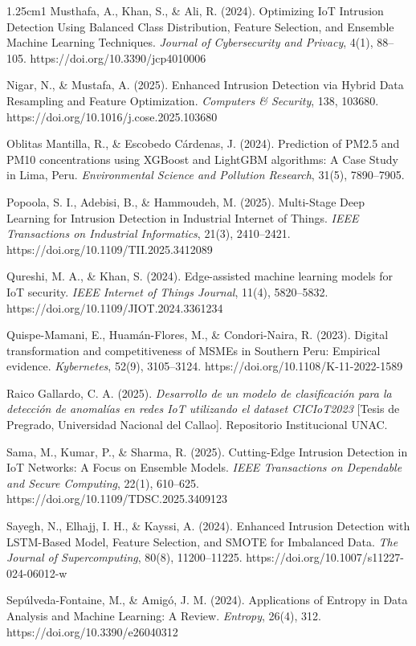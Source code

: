 \begin{hangparas}{1.25cm}{1}
Musthafa, A., Khan, S., \& Ali, R. (2024). Optimizing IoT Intrusion Detection Using Balanced Class Distribution, Feature Selection, and Ensemble Machine Learning Techniques. \textit{Journal of Cybersecurity and Privacy}, 4(1), 88--105. https://doi.org/10.3390/jcp4010006

Nigar, N., \& Mustafa, A. (2025). Enhanced Intrusion Detection via Hybrid Data Resampling and Feature Optimization. \textit{Computers \& Security}, 138, 103680. https://doi.org/10.1016/j.cose.2025.103680

Oblitas Mantilla, R., \& Escobedo Cárdenas, J. (2024). Prediction of PM2.5 and PM10 concentrations using XGBoost and LightGBM algorithms: A Case Study in Lima, Peru. \textit{Environmental Science and Pollution Research}, 31(5), 7890--7905.

Popoola, S. I., Adebisi, B., \& Hammoudeh, M. (2025). Multi-Stage Deep Learning for Intrusion Detection in Industrial Internet of Things. \textit{IEEE Transactions on Industrial Informatics}, 21(3), 2410--2421. https://doi.org/10.1109/TII.2025.3412089

Qureshi, M. A., \& Khan, S. (2024). Edge-assisted machine learning models for IoT security. \textit{IEEE Internet of Things Journal}, 11(4), 5820--5832. https://doi.org/10.1109/JIOT.2024.3361234

Quispe-Mamani, E., Huamán-Flores, M., \& Condori-Naira, R. (2023). Digital transformation and competitiveness of MSMEs in Southern Peru: Empirical evidence. \textit{Kybernetes}, 52(9), 3105--3124. https://doi.org/10.1108/K-11-2022-1589

Raico Gallardo, C. A. (2025). \textit{Desarrollo de un modelo de clasificación para la detección de anomalías en redes IoT utilizando el dataset CICIoT2023} [Tesis de Pregrado, Universidad Nacional del Callao]. Repositorio Institucional UNAC.

Sama, M., Kumar, P., \& Sharma, R. (2025). Cutting-Edge Intrusion Detection in IoT Networks: A Focus on Ensemble Models. \textit{IEEE Transactions on Dependable and Secure Computing}, 22(1), 610--625. https://doi.org/10.1109/TDSC.2025.3409123

Sayegh, N., Elhajj, I. H., \& Kayssi, A. (2024). Enhanced Intrusion Detection with LSTM-Based Model, Feature Selection, and SMOTE for Imbalanced Data. \textit{The Journal of Supercomputing}, 80(8), 11200--11225. https://doi.org/10.1007/s11227-024-06012-w

Sepúlveda-Fontaine, M., \& Amigó, J. M. (2024). Applications of Entropy in Data Analysis and Machine Learning: A Review. \textit{Entropy}, 26(4), 312. https://doi.org/10.3390/e26040312


\end{hangparas}
